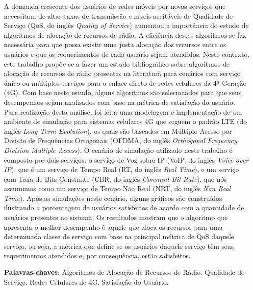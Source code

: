 \setlength{\absparsep}{18pt} %
\begin{resumo}

A demanda crescente dos usuários de redes móveis por novos serviços que necessitam de altas taxas de transmissão e níveis aceitáveis de Qualidade de Serviço (QoS, do inglês \textit{Quality of Service}) aumentou a importância do estudo de algoritmos de alocação de recursos de rádio. A eficiência desses algoritmos se faz necessária para que possa existir uma justa alocação dos recursos entre os usuários e que os requerimentos de cada usuário sejam atendidos. Neste contexto, este trabalho propõe-se a fazer um estudo bibliográfico sobre algoritmos de alocação de recursos de rádio presentes na literatura para cenários com serviço único ou múltiplos serviços para o enlace direto de redes celulares da 4ª Geração (4G). Com base neste estudo, alguns algoritmos são selecionados para que seus desempenhos sejam analisados com base na métrica de satisfação do usuário. Para realização desta análise, foi feita uma modelagem e implementação de um ambiente de simulação para sistemas celulares 4G que seguem o padrão LTE (do inglês \textit{Long Term Evolution}), os quais são baseados em Múltiplo Acesso por Divisão de Frequências Ortogonais (OFDMA, do inglês \textit{Orthogonal Frequency Division Multiple Access}). O cenário de simulação utilizado neste trabalho é composto por dois serviços: o serviço de Voz sobre IP (VoIP, do inglês \textit{Voice over IP}), que é um serviço de Tempo Real (RT, do inglês \textit{Real Time}), e um serviço com Taxa de Bits Constante (CBR, do inglês \textit{Constant Bit Rate}), que nós assumimos como um serviço de Tempo Não Real (NRT, do inglês \textit{Non Real Time}). Após as simulações neste cenário, alguns gráficos são construídos ilustrando a porcentagem de usuários satisfeitos de acordo com a quantidade de usuários presentes no sistema. Os resultados mostram que o algoritmo que apresenta o melhor desempenho é aquele que aloca os recursos para uma determinada classe de serviço com base na principal métrica de QoS daquele serviço, ou seja, a métrica que define se os usuários daquele serviço têm seus requerimentos atendidos e, por consequência, estão satisfeitos.
      
\textbf{Palavras-chaves}: Algoritmos de Alocação de Recursos de Rádio. Qualidade de Serviço. Redes Celulares de 4G. Satisfação do Usuário.
\end{resumo}